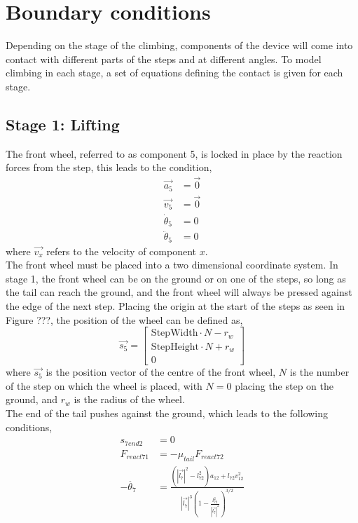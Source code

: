 \section{Boundary conditions}
Depending on the stage of the climbing, components of the device will come into contact with different parts of the steps and at different angles. To model climbing in each stage, a set of equations defining the contact is given for each stage.\\
\subsection*{Stage 1: Lifting}
The front wheel, referred to as component 5, is locked in place by the reaction forces from the step, this leads to the condition,
\begin{subequations}
	\label{wheel1locked}
	\begin{align}
		\vec{a_5} &= \vec{0}\\
		\vec{v_5} &= \vec{0}\\
		\dot{\theta}_5 &= 0\\
		\ddot{\theta}_5 &= 0
	\end{align}
\end{subequations}
where $\vec{v_x}$ refers to the velocity of component $x$.\\
The front wheel must be placed into a two dimensional coordinate system. In stage 1, the front wheel can be on the ground or on one of the steps, so long as the tail can reach the ground, and the front wheel will always be pressed against the edge of the next step. Placing the origin at the start of the steps as seen in Figure ???, the position of the wheel can be defined as,
\begin{equation}
	\vec{s_5}
	=
	\begin{bmatrix}
		\mathrm{StepWidth}\cdot N-r_w\\
		\mathrm{StepHeight}\cdot N+r_w\\
		0
	\end{bmatrix}
\end{equation}
where $\vec{s_5}$ is the position vector of the centre of the front wheel, $N$ is the number of the step on which the wheel is placed, with $N = 0$ placing the step on the ground, and $r_w$ is the radius of the wheel.\\
The end of the tail pushes against the ground, which leads to the following conditions,
\begin{subequations}
	\label{tailonground}
	\begin{align}
		s_{7end2} &= 0\\
		F_{react71} &=  -\mu_{tail}F_{react72}\\
		-\ddot{\theta_7} &= \frac{(|\vec{l_7}|^2 - l_{72}^2)a_{12} + l_{72}v_{12}^2}{|\vec{l_7}|^3 (1 - \frac{l_{72}^2}{|\vec{l_7}|^2})^{3/2}} \label{tailongroundkinematics}
	\end{align}
\end{subequations}
